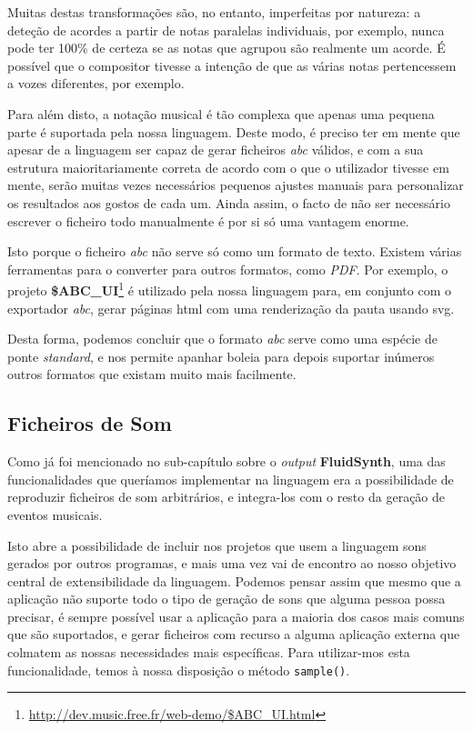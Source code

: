 Muitas destas transformações são, no entanto, imperfeitas por natureza: a deteção de acordes a partir de notas paralelas individuais, por exemplo, nunca pode ter 100\% de certeza se as notas que agrupou são realmente um acorde. É possível que o compositor tivesse a intenção de que as várias notas pertencessem a vozes diferentes, por exemplo.

Para além disto, a notação musical é tão complexa que apenas uma pequena parte é suportada pela nossa linguagem. Deste modo, é preciso ter em mente que apesar de a linguagem ser capaz de gerar ficheiros \textit{abc} válidos, e com a sua estrutura maioritariamente correta de acordo com o que o utilizador tivesse em mente, serão muitas vezes necessários pequenos ajustes manuais para personalizar os resultados aos gostos de cada um. Ainda assim, o facto de não ser necessário escrever o ficheiro todo manualmente é por si só uma vantagem enorme.

Isto porque o ficheiro \textit{abc} não serve só como um formato de texto. Existem várias ferramentas para o converter para outros formatos, como \textit{PDF}. Por exemplo, o projeto \textbf{\$ABC\_UI}\footnote{\url{http://dev.music.free.fr/web-demo/\$ABC_UI.html}} é utilizado pela nossa linguagem para, em conjunto com o exportador \textit{abc}, gerar páginas \acrshort{html} com uma renderização da pauta usando \acrfull{svg}.

Desta forma, podemos concluir que o formato \textit{abc} serve como uma espécie de ponte \textit{standard}, e nos permite apanhar boleia para depois suportar inúmeros outros formatos que existam muito mais facilmente.


\subsection{Ficheiros de Som}
Como já foi mencionado no sub-capítulo sobre o \textit{output} \textbf{FluidSynth}, uma das funcionalidades que queríamos implementar na linguagem era a possibilidade de reproduzir ficheiros de som arbitrários, e integra-los com o resto da geração de eventos musicais.

Isto abre a possibilidade de incluir nos projetos que usem a linguagem sons gerados por outros programas, e mais uma vez vai de encontro ao nosso objetivo central de extensibilidade da linguagem. Podemos pensar assim que mesmo que a aplicação não suporte todo o tipo de geração de sons que alguma pessoa possa precisar, é sempre possível usar a aplicação para a maioria dos casos mais comuns que são suportados, e gerar ficheiros com recurso a alguma aplicação externa que colmatem as nossas necessidades mais específicas. Para utilizar-mos esta funcionalidade, temos à nossa disposição o método \texttt{sample()}.

